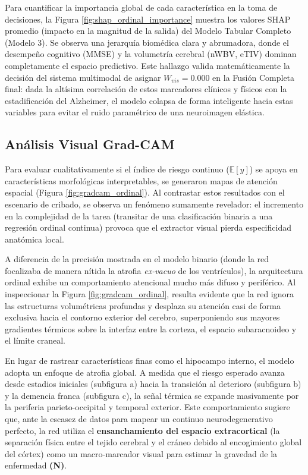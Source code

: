 \documentclass[12pt, oneside, english, spanish]{book}
\begin{document}
Para cuantificar la importancia global de cada característica en la toma de decisiones, la Figura \ref{fig:shap_ordinal_importance} muestra los valores SHAP promedio (impacto en la magnitud de la salida) del Modelo Tabular Completo (Modelo 3). Se observa una jerarquía biomédica clara y abrumadora, donde el desempeño cognitivo (MMSE) y la volumetría cerebral (nWBV, eTIV) dominan completamente el espacio predictivo. Este hallazgo valida matemáticamente la decisión del sistema multimodal de asignar $W_{vis}=0.000$ en la Fusión Completa final: dada la altísima correlación de estos marcadores clínicos y físicos con la estadificación del Alzheimer, el modelo colapsa de forma inteligente hacia estas variables para evitar el ruido paramétrico de una neuroimagen elástica.

\subsection{Análisis Visual Grad-CAM} \label{subsec:ordinal_gradcam}

Para evaluar cualitativamente si el índice de riesgo continuo ($\mathbb{E}[y]$) se apoya en características morfológicas interpretables, se generaron mapas de atención espacial (Figura \ref{fig:gradcam_ordinal}). Al contrastar estos resultados con el escenario de cribado, se observa un fenómeno sumamente revelador: el incremento en la complejidad de la tarea (transitar de una clasificación binaria a una regresión ordinal continua) provoca que el extractor visual pierda especificidad anatómica local.

A diferencia de la precisión mostrada en el modelo binario (donde la red focalizaba de manera nítida la atrofia \textit{ex-vacuo} de los ventrículos), la arquitectura ordinal exhibe un comportamiento atencional mucho más difuso y periférico. Al inspeccionar la Figura \ref{fig:gradcam_ordinal}, resulta evidente que la red ignora las estructuras volumétricas profundas y desplaza su atención casi de forma exclusiva hacia el contorno exterior del cerebro, superponiendo sus mayores gradientes térmicos sobre la interfaz entre la corteza, el espacio subaracnoideo y el límite craneal.

En lugar de rastrear características finas como el hipocampo interno, el modelo adopta un enfoque de atrofia global. A medida que el riesgo esperado avanza desde estadios iniciales (subfigura a) hacia la transición al deterioro (subfigura b) y la demencia franca (subfigura c), la señal térmica se expande masivamente por la periferia parieto-occipital y temporal exterior. Este comportamiento sugiere que, ante la escasez de datos para mapear un continuo neurodegenerativo perfecto, la red utiliza el \textbf{ensanchamiento del espacio extracortical} (la separación física entre el tejido cerebral y el cráneo debido al encogimiento global del córtex) como un macro-marcador visual para estimar la gravedad de la enfermedad \textbf{(N)}.
\end{document}
